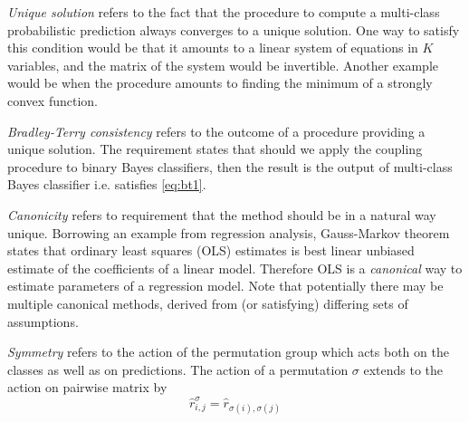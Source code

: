 \documentclass[twoside,11pt]{article}
\begin{document}
%



\emph{Unique solution} refers to the fact that the procedure to compute a multi-class probabilistic prediction always converges to a unique solution. One way to satisfy this condition would be that it amounts to a linear system of equations in $K$ variables, and the matrix of the system would be invertible. Another example would be when the procedure amounts to finding the minimum of a strongly convex function. 

\emph{Bradley-Terry consistency} refers to the outcome of a procedure providing a unique solution. The requirement states that should we apply the coupling procedure to binary Bayes classifiers, then the result is the output of multi-class Bayes classifier i.e. satisfies \eqref{eq:bt1}.

\emph{Canonicity} refers to requirement that the method should be in a natural way unique. Borrowing an example from regression analysis, Gauss-Markov theorem states that ordinary least squares (OLS) estimates is best linear unbiased estimate of the coefficients of a linear model. Therefore OLS  is a \emph{canonical} way to estimate parameters of a regression model. Note that potentially there may be multiple canonical methods, derived from (or satisfying) differing sets of assumptions. 

\emph{Symmetry} refers to the action of the permutation group which acts both on the classes as well as on predictions. The action of a permutation $\sigma$ extends to the action on pairwise matrix by 
\begin{equation}
	\hat r^\sigma_{i,j} = \hat r_{\sigma(i), \sigma(j)}
\end{equation}
\end{document}
